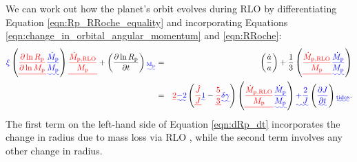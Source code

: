 \documentclass{svjour3}                     %
\providecommand{\DIFadd}[1]{{\protect\color{blue}\uwave{#1}}} %
\providecommand{\DIFdel}[1]{{\protect\color{red}\sout{#1}}}                      %
\providecommand{\DIFaddbegin}{} %
\providecommand{\DIFaddend}{} %
\providecommand{\DIFdelbegin}{} %
\providecommand{\DIFdelend}{} %
\begin{document}
We can work out how the planet's orbit evolves during RLO by differentiating Equation \ref{eqn:Rp_RRoche_equality} and incorporating Equations \ref{eqn:change_in_orbital_angular_momentum} and \ref{eqn:RRoche}:
\begin{eqnarray}
\DIFaddbegin \DIFadd{\xi }\DIFaddend \left( \DIFdelbegin \DIFdel{\frac{\partial \ln R_{\rm p}}{\partial \ln M_{\rm p}} }\DIFdelend \DIFaddbegin \DIFadd{\frac{\dot{M}_{\rm p}}{M_{\rm p}} }\DIFaddend \right) \DIFdelbegin %
\DIFdel{\frac{\dot{M}_{\rm p, RLO}}{M_{\rm p}} }%
\DIFdelend + \left( \frac{\partial \ln R_{\rm p}}{\partial t} \right)\DIFaddbegin \DIFadd{_{\rm M_{\rm p}} }\DIFaddend & = & \left( \frac{\dot{a}}{a} \right) + \frac{1}{3} \left( \DIFdelbegin \DIFdel{\frac{\dot{M}_{\rm p, RLO}}{M_{\rm p}} }\DIFdelend \DIFaddbegin \DIFadd{\frac{\dot{M}_{\rm p}}{M_{\rm p}} }\DIFaddend \right) \nonumber \\ 
& = & \DIFdelbegin \DIFdel{2 }\DIFdelend \DIFaddbegin \DIFadd{-2 }\DIFaddend \left(\DIFdelbegin \DIFdel{\frac{\dot{J}}{J} }%
\DIFdelend \DIFaddbegin \DIFadd{1 }\DIFaddend - \DIFdelbegin \DIFdel{\frac{5}{3} }\DIFdelend \DIFaddbegin \DIFadd{\delta \gamma }\right) \DIFaddend \left( \DIFdelbegin \DIFdel{\frac{\dot{M}_{\rm p, RLO}}{M_{\rm p}} }\DIFdelend \DIFaddbegin \DIFadd{\frac{\dot{M}_{\rm p}}{M_{\rm p}}}\DIFaddend \right) \DIFaddbegin \DIFadd{+ \frac{2}{J} }\left( \DIFadd{\frac{\partial J}{\partial t}}\right)\DIFadd{_{\rm tides}}\DIFaddend .
\label{eqn:dRp_dt}
\end{eqnarray}
The first term on the left-hand side of Equation \ref{eqn:dRp_dt} incorporates the change in radius due to mass loss via RLO \DIFaddbegin \DIFadd{(with $\xi = \partial \ln R_{\rm p}/\partial \ln M_{\rm p}$)}\DIFaddend , while the second term involves any other change in radius.  
\end{document}
